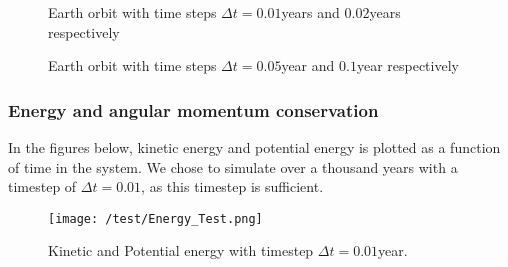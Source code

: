 \documentclass[../main.tex]{subfiles}
\begin{document}
\begin{figure}[!h]
  \centering
  \caption{Earth orbit with time steps $\Delta t = 0.01$years and $0.02$years respectively }
  \label{fig:results-Timestep1}
\end{figure}
\FloatBarrier
\begin{figure}[!h]
  \centering
  \caption{Earth orbit with time steps $\Delta t = 0.05$year and $0.1$year respectively }
  \label{fig:results-Timestep2}
\end{figure}
\FloatBarrier

\subsubsection{Energy and angular momentum conservation}\label{sec:results-test-conservation}
In the figures below, kinetic energy and potential energy is plotted as a function of time in the system. We chose to simulate over a thousand years with a timestep of $\Delta t = 0.01$, as this timestep is sufficient.
\begin{figure}[!h]
  \centering
  \texttt{[image: /test/Energy\_Test.png]} %
  \caption{Kinetic and Potential energy with timestep $\Delta t = 0.01$year.}
  \label{fig:results-Energies}
\end{figure}
\FloatBarrier
\end{document}
